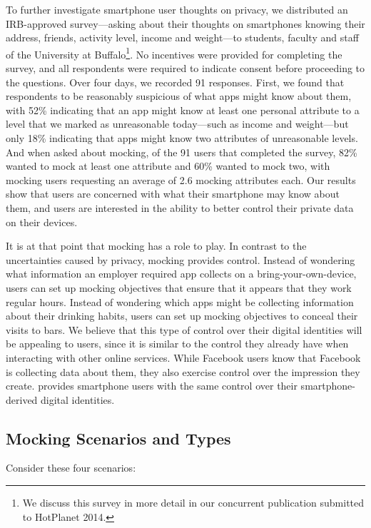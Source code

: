 To further investigate smartphone user thoughts on privacy, we distributed an
IRB-approved survey---asking about their thoughts on smartphones knowing their
address, friends, activity level, income and weight---to students, faculty and
staff of the University at Buffalo\footnote{We discuss this survey in more
detail in our concurrent publication submitted to HotPlanet 2014.}. No
incentives were provided for completing  the  survey,  and all  respondents
were  required to indicate consent before proceeding to the questions.  Over
four days, we recorded 91 responses. First,  we  found  that respondents  to be
reasonably suspicious of what apps might know about them, with 52\% indicating
that  an app  might  know  at  least  one personal attribute  to a  level  that
we marked  as  unreasonable  today---such as income and weight---but  only 18\%
indicating that  apps might know two attributes of unreasonable levels.  And
when asked about mocking,  of the 91 users that  completed  the  survey, 82\%
wanted  to mock  at least one attribute and 60\% wanted to mock two, with
mocking users requesting an average of 2.6 mocking attributes each. Our results
show that users are concerned with what their smartphone may know about them,
and users are interested in the ability to better control their private data on
their devices.

It is at that point that mocking has a role to play. In contrast to the
uncertainties caused by privacy, mocking provides control. Instead of
wondering what information an employer required app collects on a
bring-your-own-device, users can set up mocking objectives that
ensure that it appears that they work regular hours. Instead of wondering
which apps might be collecting information about their drinking habits, users
can set up mocking objectives to conceal their visits to bars. We believe
that this type of control over their digital identities will be appealing
to users, since it is similar to the control they already have when
interacting with other online services. While Facebook users know that
Facebook is collecting data about them, they also exercise control over the
impression they create. \PocketMocker{} provides smartphone users with the
same control over their smartphone-derived digital identities.


\subsection{Mocking Scenarios and Types}

Consider these four scenarios:
\vspace*{-0.2in}

